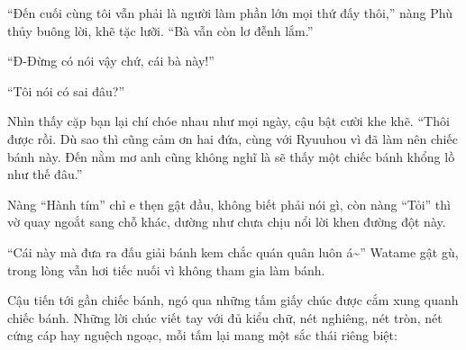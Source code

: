 \documentclass[../main.tex]{subfiles}
\begin{document}
``Đến cuối cùng tôi vẫn phải là người làm phần lớn mọi thứ đấy thôi,'' nàng Phù thủy buông lời, khẽ tặc lưỡi. ``Bà vẫn còn lơ đễnh lắm.''

``Đ-Đừng có nói vậy chứ, cái bà này!''

``Tôi nói có sai đâu?''

Nhìn thấy cặp bạn lại chí chóe nhau như mọi ngày, cậu bật cười khe khẽ. ``Thôi được rồi. Dù sao thì cũng cảm ơn hai đứa, cùng với Ryuuhou vì đã làm nên chiếc bánh này. Đến nằm mơ anh cũng không nghĩ là sẽ thấy một chiếc bánh khổng lồ như thế đâu.''

Nàng ``Hành tím'' chỉ e thẹn gật đầu, không biết phải nói gì, còn nàng ``Tỏi'' thì vờ quay ngoắt sang chỗ khác, dường như chưa chịu nổi lời khen đường đột này.

``Cái này mà đưa ra đấu giải bánh kem chắc quán quân luôn á\~{}'' Watame gật gù, trong lòng vẫn hơi tiếc nuối vì không tham gia làm bánh.

Cậu tiến tới gần chiếc bánh, ngó qua những tấm giấy chúc được cắm xung quanh chiếc bánh. Những lời chúc viết tay với đủ kiểu chữ, nét nghiêng, nét tròn, nét cứng cáp hay nguệch ngoạc, mỗi tấm lại mang một sắc thái riêng biệt:
\end{document}
